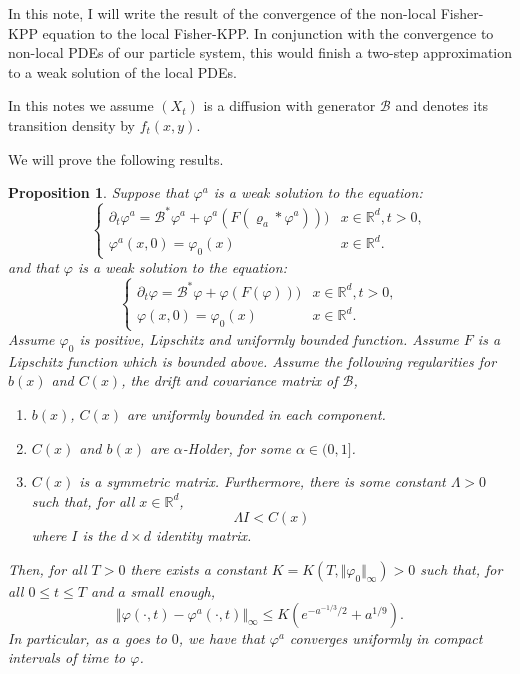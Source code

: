 \documentclass[a4paper,12pt]{article}
\newtheorem{proposition}[theorem]{Proposition}
\newcommand{\DG}{\mathcal{B}}
\newcommand{\1}{{\bf {1}}}
\begin{document}
In this note, I will write the result of the convergence of the non-local Fisher-KPP equation to the local Fisher-KPP. In conjunction with the convergence to non-local PDEs of our particle system, this would finish a two-step approximation to a weak solution of  the local PDEs.

In this notes we assume $(X_t)$ is a diffusion with generator $\DG$ and denotes its transition density by $f_t(x,y)$.

We will prove the following results.
\begin{proposition}
    \label{prop:nonlocal_to_local}
    Suppose that $\varphi^a$ is a weak solution to the equation:
    \begin{equation}
\label{nonlocalPDEv1} \begin{cases}
\partial_t \varphi^a = \DG^* \varphi^a + \varphi^a (F(\varrho_a*\varphi^a)))  & x \in \mathbb{R}^d, t >0, \\ \varphi^a(x,0) = \varphi_0(x) & x \in \mathbb{R}^d.
\end{cases}
\end{equation}
and that $\varphi$ is a weak solution to the equation:
 \begin{equation}
\label{localPDE} \begin{cases}
\partial_t \varphi = \DG^* \varphi + \varphi (F(\varphi)))  & x \in \mathbb{R}^d, t >0, \\ \varphi(x,0) = \varphi_0(x) & x \in \mathbb{R}^d.
\end{cases}
\end{equation}
Assume $\varphi_0$ is positive, Lipschitz and uniformly bounded function. Assume $F$ is a Lipschitz function which is bounded above. Assume the following regularities for $b(x)$ and $C(x)$, the drift and covariance matrix of $\DG$,
\begin{enumerate}
    \item $b(x)$, $C(x)$ are uniformly bounded in each component.
    \item $C(x)$ and $b(x)$ are $\alpha$-Holder, for some $\alpha \in (0,1]$.
    \item $C(x)$ is a symmetric matrix. Furthermore, there is some constant $\Lambda>0$ such that, for all $x \in \mathbb{R}^d$,
    \[ \Lambda I< C(x) \]
    where $I$ is the $d \times d$ identity matrix.
\end{enumerate}
Then, for all $T>0$ there exists a constant $K=K(T, \Vert \varphi_0 \Vert_\infty)>0$ such that, for all $0 \leq t \leq T$ and $a$ small enough,
\[ \Vert \varphi(\cdot,t) - \varphi^a(\cdot,t) \Vert_\infty \leq K\left( e^{-a^{-1/3}/2} + a^{1/9}\right).\]
In particular, as $a$ goes to $0$, we have that $\varphi^a$ converges uniformly in compact intervals of time to $\varphi$.
\end{proposition}
\end{document}

